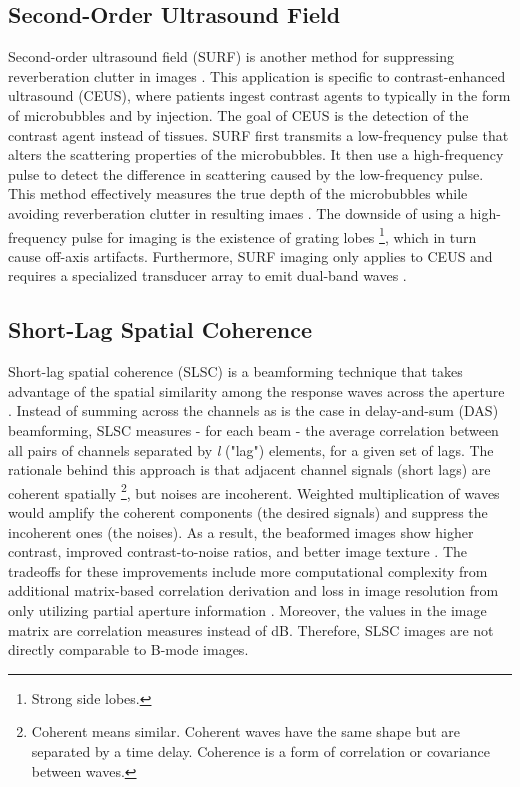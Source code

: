     \subsection{Second-Order Ultrasound Field}
      Second-order ultrasound field (SURF) is another method for suppressing reverberation clutter in images \cite{angelsen2007surf}. This application is specific to contrast-enhanced ultrasound (CEUS), where patients ingest contrast agents to typically in the form of microbubbles and by injection. The goal of CEUS is the detection of the contrast agent instead of tissues. SURF first transmits a low-frequency pulse that alters the scattering properties of the microbubbles. It then use a high-frequency pulse to detect the difference in scattering caused by the low-frequency pulse. This method effectively measures the true depth of the microbubbles while avoiding reverberation clutter in resulting imaes \cite{masoy2019surf}. The downside of using a high-frequency pulse for imaging is the existence of grating lobes \footnote{Strong side lobes.}, which in turn cause off-axis artifacts. Furthermore, SURF imaging only applies to CEUS and requires a specialized transducer array to emit dual-band waves \cite{dei_thesis}.

    \subsection{Short-Lag Spatial Coherence}
      Short-lag spatial coherence (SLSC) is a beamforming technique that takes advantage of the spatial similarity among the response waves across the aperture \cite{slsc}. Instead of summing across the channels as is the case in delay-and-sum (DAS) beamforming, SLSC measures - for each beam - the average correlation between all pairs of channels separated by \textit{l} ("lag") elements, for a given set of lags. The rationale behind this approach is that adjacent channel signals (short lags) are coherent spatially \footnote{Coherent means similar. Coherent waves have the same shape but are separated by a time delay. Coherence is a form of correlation or covariance between waves.}, but noises are incoherent. Weighted multiplication of waves would amplify the coherent components (the desired signals) and suppress the incoherent ones (the noises). As a result, the beaformed images show higher contrast, improved contrast-to-noise ratios, and better image texture \cite{dahl2017coherence}. The tradeoffs for these improvements include more computational complexity from additional matrix-based correlation derivation and loss in image resolution from only utilizing partial aperture information \cite{lediju2015resolution}. Moreover, the values in the image matrix are correlation measures instead of dB. Therefore, SLSC images are not directly comparable to B-mode images.

